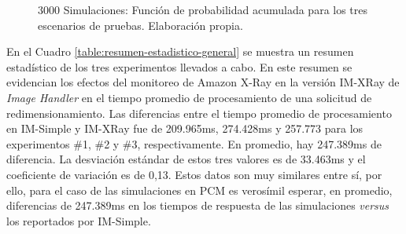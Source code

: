 \begin{figure}
\hspace{-2cm}
\caption[\hspace{0.2cm} 3000 Simulaciones: Función de probabilidad acumulada para los tres escenarios de pruebas]{3000 Simulaciones: Función de probabilidad acumulada para los tres escenarios de pruebas. Elaboración propia.}
\label{fig-probabilidad-acumulada-3-casos}
\end{figure}

En el Cuadro \ref{table:resumen-estadistico-general} se muestra un resumen estadístico de los tres experimentos llevados a cabo. En este resumen se evidencian los efectos del monitoreo de Amazon X-Ray en la versión IM-XRay de \emph{Image Handler} en el tiempo promedio de procesamiento de una solicitud de redimensionamiento. Las diferencias entre el tiempo promedio de procesamiento en IM-Simple y IM-XRay fue de 209.965ms, 274.428ms y 257.773 para los experimentos \#1, \#2 y \#3, respectivamente. En promedio, hay 247.389ms de diferencia. La desviación estándar de estos tres valores es de 33.463ms y el coeficiente de variación es de 0,13. Estos datos son muy similares entre sí, por ello, para el caso de las simulaciones en PCM es verosímil esperar, en promedio,  diferencias de 247.389ms en los tiempos de respuesta de las simulaciones \emph{versus} los reportados por IM-Simple.

